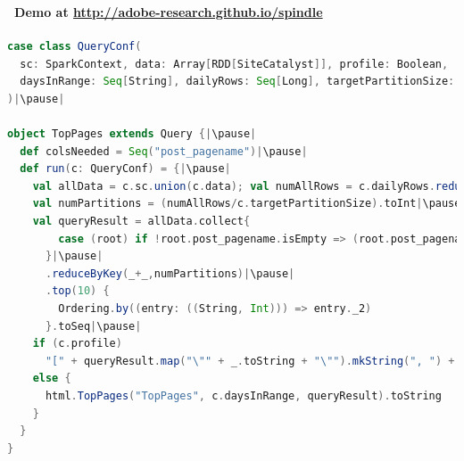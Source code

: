 \documentclass{beamer}
\begin{document}

\begin{frame}[fragile]
  \frametitle{\insertsection}
  \framesubtitle{\insertsubsection~Demo at \url{http://adobe-research.github.io/spindle}}

  \begin{lstlisting}[language=scala]
case class QueryConf(
  sc: SparkContext, data: Array[RDD[SiteCatalyst]], profile: Boolean,
  daysInRange: Seq[String], dailyRows: Seq[Long], targetPartitionSize: Long
)|\pause|

object TopPages extends Query {|\pause|
  def colsNeeded = Seq("post_pagename")|\pause|
  def run(c: QueryConf) = {|\pause|
    val allData = c.sc.union(c.data); val numAllRows = c.dailyRows.reduce(_+_)
    val numPartitions = (numAllRows/c.targetPartitionSize).toInt|\pause|
    val queryResult = allData.collect{
        case (root) if !root.post_pagename.isEmpty => (root.post_pagename, 1)
      }|\pause|
      .reduceByKey(_+_,numPartitions)|\pause|
      .top(10) {
        Ordering.by((entry: ((String, Int))) => entry._2)
      }.toSeq|\pause|
    if (c.profile)
      "[" + queryResult.map("\"" + _.toString + "\"").mkString(", ") + "]"|\pause|
    else {
      html.TopPages("TopPages", c.daysInRange, queryResult).toString
    }
  }
}
  \end{lstlisting}
\end{frame}
\end{document}
